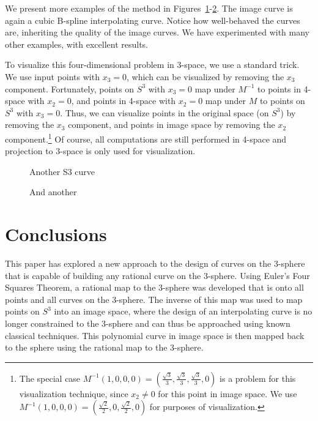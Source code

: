 We present more examples of the method in Figures~\ref{fig7}-\ref{fig8}.
The image curve is again a cubic B-spline interpolating curve.
Notice how well-behaved the curves are, inheriting the quality
of the image curves.
We have experimented with many other examples, with excellent results.

To visualize this four-dimensional problem in 3-space,
we use a standard trick.
We use input points with $x_3=0$, which can be visualized by removing
the $x_3$ component.
Fortunately, points on $S^3$ with $x_3=0$ map under $M^{-1}$ to points in 4-space with $x_2=0$,
and points in 4-space with $x_2=0$ map under $M$ to points on $S^3$ with $x_3=0$.
Thus, we can visualize points in the original space (on $S^3$) by removing
the $x_3$ component, and points in image space by removing the $x_2$ 
component.\footnote{The special case
$M^{-1}(1,0,0,0) = (\frac{\sqrt{3}}{3}, \frac{\sqrt{3}}{3}, \frac{\sqrt{3}}{3}, 0)$
is a problem for this visualization technique, 
since $x_2 \neq 0$ for this point in image space.
We use $M^{-1}(1,0,0,0) = (\frac{\sqrt{2}}{2}, 0, \frac{\sqrt{2}}{2}, 0)$
for purposes of visualization.}
Of course, all computations are still performed in 4-space and projection to 3-space
is only used for visualization.

\begin{figure}
\vspace{2.4in}
\caption{Another S3 curve}
\label{fig7}
\end{figure}

\begin{figure}
\vspace{2.4in}
\caption{And another}
\label{fig8}
\end{figure}


\section{Conclusions}
\label{sec:conclude}

This paper has explored a new approach to the design of curves
on the 3-sphere that is capable of building any rational curve on the 3-sphere.
Using Euler's Four Squares Theorem, a rational map to the 3-sphere was developed 
that is onto all points and all curves on the 3-sphere.
The inverse of this map was used to map points on $S^3$ into an image space,
where the design of an interpolating curve is no longer constrained to
the 3-sphere and can thus be approached using known classical techniques.
This polynomial curve in image space is then mapped back to the sphere using the 
rational map to the 3-sphere.


